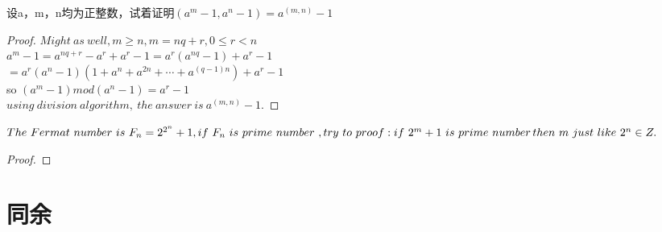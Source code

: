 \documentclass[cn,10pt]{elegantbook}
\begin{document}
\begin{problemset}
 \item 设a，m，n均为正整数，试着证明$(a^m-1,a^n-1) = a^{(m,n)}-1$
 \begin{proof}
   $Might\ as\ well,m \geq n,m = nq+r, 0 \leq r<n$ 
   \\$a^m -1 = a^{nq+r}-a^r+a^r-1 = a^r(a^{nq} -1)+a^r-1$
   \\$ = a^r(a^n-1)(1+a^n+a^{2n}+ \cdots +a^{(q-1)n})+a^r-1$
   \\so $(a^m-1) mod (a^n-1) = a^r-1$
   \\$using\ division\  algorithm,\ the \ answer \ is \ a^{(m,n)}-1.$
 \end{proof}
 \item $The \ Fermat \  number \ is \  F_n = 2^{2^n}+1,if \ F_n \ is \ prime \ number\ ,try \ to \ proof: \\ if \ 2^m+1 \ is \ prime \ number\, then\ m \ just \ like \ 2^n \in Z.$
 \begin{proof}
   
 \end{proof}
\end{problemset}
\chapter{同余}
\end{document}
